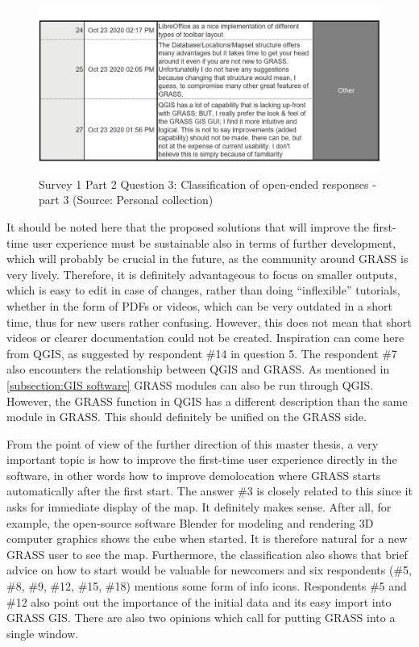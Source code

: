 \documentclass[a4paper,10pt,twoside]{article}
\begin{document}
\newpage
\vspace{0.3cm}
\begin{figure}[hbt!] 
\begin{center}
\includegraphics[width=15cm]{../surveys/analyzed_data/survey1_part2_question3_open_ended-2_1} 
\caption[Survey 1 Part 2 Question 3: Classification of open-ended responses - part 3]{Survey 1 Part 2 Question 3: Classification of open-ended responses - part 3 (Source: Personal collection)}
\label{fig:survey1_part2_question3_open_ended3_1}
\end{center}
\end{figure}

\noindent  It should be noted here that the proposed solutions that will improve the first-time user experience must be sustainable also in terms of further development, which will probably be crucial in the future, as the community around GRASS is very lively. Therefore, it is definitely advantageous to focus on smaller outputs, which is easy to edit in case of changes, rather than doing ``inflexible'' tutorials, whether in the form of PDFs or videos, which can be very outdated in a short time, thus for new users rather confusing. However, this does not mean that short videos or clearer documentation could not be created. Inspiration can come here from QGIS, as suggested by respondent \#14 in question 5. The respondent \#7 also encounters the relationship between QGIS and GRASS. As mentioned in \ref{subsection:GIS software} GRASS modules can also be run through QGIS. However, the GRASS function in QGIS has a different description than the same module in GRASS. This should definitely be unified on the GRASS side.
 
From the point of view of the further direction of this master thesis, a very important topic is how to improve the first-time user experience directly in the software, in other words how to improve demolocation where GRASS starts automatically after the first start. The answer \#3 is closely related to this since it asks for immediate display of the map. It definitely makes sense. After all, for example, the open-source software Blender for modeling and rendering 3D computer graphics shows the cube when started. It is therefore natural for a new GRASS user to see the map. Furthermore, the classification also shows that brief advice on how to start would be valuable for newcomers and six respondents (\#5, \#8, \#9, \#12, \#15, \#18) mentions some form of info icons. Respondents \#5 and \#12 also point out the importance of the initial data and its easy import into GRASS GIS. There are also two opinions which call for putting GRASS into a single window.
\end{document}
